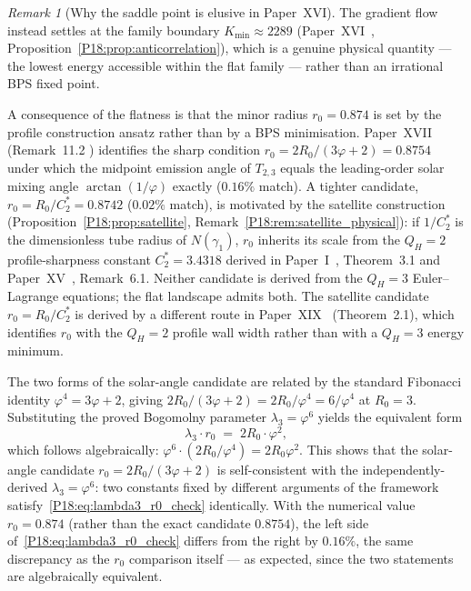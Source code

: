 \documentclass[11pt,a4paper]{article}
\theoremstyle{definition}\newtheorem{definition}[theorem]{Definition}
\theoremstyle{remark}
\newtheorem{remark}[theorem]{Remark}
\newcommand{\vp}{\varphi}
\newcommand{\QH}{Q_H}
\begin{document}
\begin{remark}[Why the saddle point is elusive in Paper~XVI]
The gradient flow instead settles at the
family boundary $K_{\min}\approx2289$ (Paper~XVI~\cite{Paper16},
Proposition~\ref{P18:prop:anticorrelation}), which is a genuine physical
quantity --- the lowest energy accessible within the flat family ---
rather than an irrational BPS fixed point.

A consequence of the flatness is that the minor radius $r_0=0.874$
is set by the profile construction ansatz rather than by a BPS
minimisation.  Paper~XVII~\cite{Paper17} (Remark~11.2 %
)
identifies the sharp condition $r_0=2R_0/(3\vp+2)=0.8754$ under
which the midpoint emission angle of $T_{2,3}$ equals the leading-order
solar mixing angle $\arctan(1/\vp)$ exactly ($0.16\%$ match).  A
tighter candidate, $r_0=R_0/C_2^*=0.8742$ ($0.02\%$ match), is
motivated by the satellite construction
(Proposition~\ref{P18:prop:satellite},
Remark~\ref{P18:rem:satellite_physical}): if $1/C_2^*$ is the
dimensionless tube radius of $N(\gamma_1)$, $r_0$ inherits its scale
from the $\QH=2$ profile-sharpness constant $C_2^*=3.4318$ derived
in Paper~I~\cite{Paper1}, Theorem~3.1 and Paper~XV~\cite{Paper15},
Remark~6.1.  %
Neither candidate is derived from the $\QH=3$ Euler--Lagrange
equations; the flat landscape admits both.  The satellite candidate
$r_0=R_0/C_2^*$ is derived by a different route in
Paper~XIX~\cite{Paper19} (Theorem~2.1), %
which identifies $r_0$ with the $\QH=2$ profile wall width rather
than with a $\QH=3$ energy minimum.

The two forms of the solar-angle candidate are related by the
standard Fibonacci identity $\vp^4=3\vp+2$, giving
$2R_0/(3\vp+2) = 2R_0/\vp^4 = 6/\vp^4$ at $R_0=3$.
Substituting the proved Bogomolny parameter $\lambda_3=\vp^6$
yields the equivalent form
\begin{equation}
  \lambda_3\cdot r_0 \;=\; 2R_0\cdot\vp^2,
  \label{P18:eq:lambda3_r0_check}
\end{equation}
which follows algebraically:
$\vp^6\cdot(2R_0/\vp^4)=2R_0\vp^2$.  This shows that the solar-angle
candidate $r_0=2R_0/(3\vp+2)$ is self-consistent with the
independently-derived $\lambda_3=\vp^6$: two constants fixed by
different arguments of the framework satisfy~\eqref{P18:eq:lambda3_r0_check}
identically.  With the numerical value $r_0=0.874$ (rather than the
exact candidate $0.8754$), the left side of~\eqref{P18:eq:lambda3_r0_check}
differs from the right by $0.16\%$, the same discrepancy as the
$r_0$ comparison itself --- as expected, since the two statements are
algebraically equivalent.


\end{remark}
\end{document}
